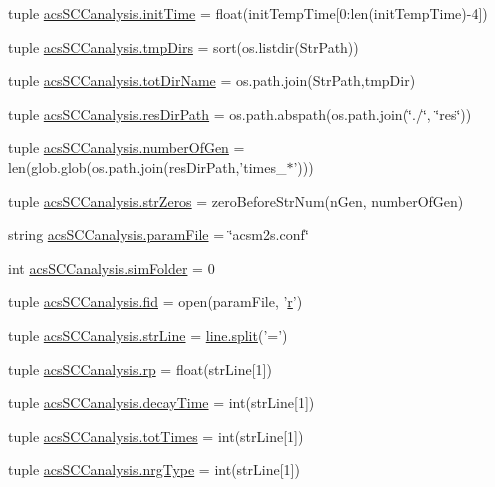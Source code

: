 \begin{DoxyCompactItemize}
\item 
tuple \hyperlink{a00102_a826c1b0585b4e8474c76f92bd7583836}{acs\-S\-C\-Canalysis.\-init\-Time} = float(init\-Temp\-Time\mbox{[}0\-:len(init\-Temp\-Time)-\/4\mbox{]})
\item 
tuple \hyperlink{a00102_ace4c571efd2e5ecd266ce5701f761a83}{acs\-S\-C\-Canalysis.\-tmp\-Dirs} = sort(os.\-listdir(Str\-Path))
\item 
tuple \hyperlink{a00102_a5903034df3d32525785e697152efbeb3}{acs\-S\-C\-Canalysis.\-tot\-Dir\-Name} = os.\-path.\-join(Str\-Path,tmp\-Dir)
\item 
tuple \hyperlink{a00102_a9ededb3cd7c63befde39ad68e5f9e006}{acs\-S\-C\-Canalysis.\-res\-Dir\-Path} = os.\-path.\-abspath(os.\-path.\-join(\char`\"{}./\char`\"{}, \char`\"{}res\char`\"{}))
\item 
tuple \hyperlink{a00102_a9a81829f850e2e125e3c94214da7a1f0}{acs\-S\-C\-Canalysis.\-number\-Of\-Gen} = len(glob.\-glob(os.\-path.\-join(res\-Dir\-Path,'times\-\_\-$\ast$')))
\item 
tuple \hyperlink{a00102_a8ba6aefb71b3d1e575eac38627f143d6}{acs\-S\-C\-Canalysis.\-str\-Zeros} = zero\-Before\-Str\-Num(n\-Gen, number\-Of\-Gen)
\item 
string \hyperlink{a00102_a7160f8e48b4aafebbd75e9037fc9fef7}{acs\-S\-C\-Canalysis.\-param\-File} = \char`\"{}acsm2s.\-conf\char`\"{}
\item 
int \hyperlink{a00102_a58095f64afeda893517e81226e1963c3}{acs\-S\-C\-Canalysis.\-sim\-Folder} = 0
\item 
tuple \hyperlink{a00102_a424e2204e89264a827e6cad861ebcbc1}{acs\-S\-C\-Canalysis.\-fid} = open(param\-File, '\hyperlink{a00031_ac862e7284527eb913b1351c8bfb8e079}{r}')
\item 
tuple \hyperlink{a00102_a072631e11db72789389935b0f9efff8d}{acs\-S\-C\-Canalysis.\-str\-Line} = \hyperlink{a00076_a4d1aa74fac80ae0275c056575fdb6626}{line.\-split}('=')
\item 
tuple \hyperlink{a00102_a98150f532e09ebae495212500d2f1799}{acs\-S\-C\-Canalysis.\-rp} = float(str\-Line\mbox{[}1\mbox{]})
\item 
tuple \hyperlink{a00102_a80a6d3cf3f4ccdc596054300761972a9}{acs\-S\-C\-Canalysis.\-decay\-Time} = int(str\-Line\mbox{[}1\mbox{]})
\item 
tuple \hyperlink{a00102_a20df40e09bc9514382d71f15783c7856}{acs\-S\-C\-Canalysis.\-tot\-Times} = int(str\-Line\mbox{[}1\mbox{]})
\item 
tuple \hyperlink{a00102_a0d0c83fd90489be59b1f5a31dadf4469}{acs\-S\-C\-Canalysis.\-nrg\-Type} = int(str\-Line\mbox{[}1\mbox{]})

\end{DoxyCompactItemize}
